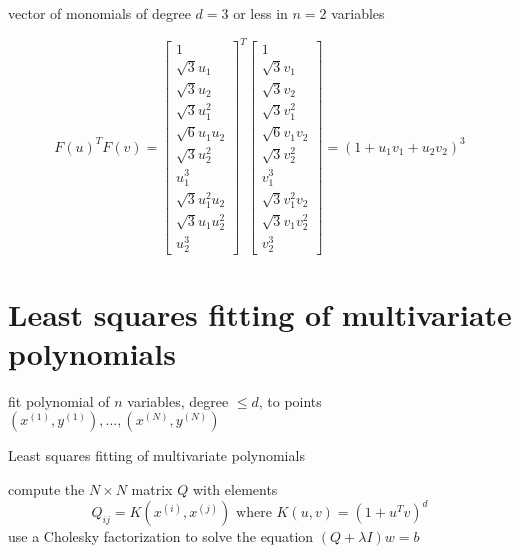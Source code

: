 \begin{example}
    vector of monomials of degree $ d=3 $ or less in $ n=2 $ variables

\begin{equation} F(u)^{T} F(v)=\left[\begin{array}{c}1 \\ \sqrt{3} u_{1} \\ \sqrt{3} u_{2} \\ \sqrt{3} u_{1}^{2} \\ \sqrt{6} u_{1} u_{2} \\ \sqrt{3} u_{2}^{2} \\ u_{1}^{3} \\ \sqrt{3} u_{1}^{2} u_{2} \\ \sqrt{3} u_{1} u_{2}^{2} \\ u_{2}^{3}\end{array}\right]^{T}\left[\begin{array}{c}1 \\ \sqrt{3} v_{1} \\ \sqrt{3} v_{2} \\ \sqrt{3} v_{1}^{2} \\ \sqrt{6} v_{1} v_{2} \\ \sqrt{3} v_{2}^{2} \\ v_{1}^{3} \\ \sqrt{3} v_{1}^{2} v_{2} \\ \sqrt{3} v_{1} v_{2}^{2} \\ v_{2}^{3}\end{array}\right] 
 =\left(1+u_{1} v_{1}+u_{2} v_{2}\right)^{3} \end{equation}
\end{example}



\section{Least squares fitting of multivariate polynomials}

\begin{problem}
    fit polynomial of $ n $ variables, degree $ \leq d $, to points $ \left(x^{(1)}, y^{(1)}\right), \ldots,\left(x^{(N)}, y^{(N)}\right) $ 
\end{problem}

\begin{algorithm}[htbp]
    \caption{Least squares fitting of multivariate polynomials}
    compute the $ N \times N $ matrix $ Q $ with elements
\begin{equation}
Q_{i j}=K\left(x^{(i)}, x^{(j)}\right) \text { where } K(u, v)=\left(1+u^{T} v\right)^{d}
\end{equation}\;
use a Cholesky factorization to solve the equation $ (Q+\lambda I) w=b $
\end{algorithm}

